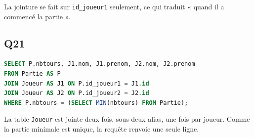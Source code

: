 \documentclass[11pt,a4paper]{article}
\begin{document}
La jointure se fait sur \texttt{id\_joueur1} seulement, ce qui traduit « quand il a commencé la partie ».

\hypertarget{q21}{%
\subsection{Q21}\label{q21}}

\begin{lstlisting}[language=SQL]
SELECT P.nbtours, J1.nom, J1.prenom, J2.nom, J2.prenom
FROM Partie AS P
JOIN Joueur AS J1 ON P.id_joueur1 = J1.id
JOIN Joueur AS J2 ON P.id_joueur2 = J2.id
WHERE P.nbtours = (SELECT MIN(nbtours) FROM Partie);
\end{lstlisting}

La table \texttt{Joueur} est jointe deux fois, sous deux alias, une fois par joueur. Comme la partie minimale est unique, la requête renvoie une seule ligne.
\end{document}
